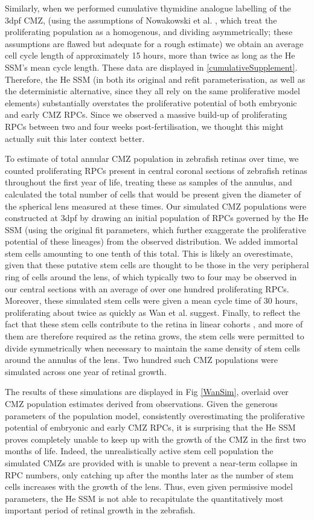 Similarly, when we performed cumulative thymidine analogue labelling of the 3dpf CMZ, (using the assumptions of Nowakowski et al. \cite{Nowakowski1989}, which treat the proliferating population as a homogenous, and dividing asymmetrically; these assumptions are flawed but adequate for a rough estimate) we obtain an average cell cycle length of approximately 15 hours, more than twice as long as the He SSM's mean cycle length. These data are displayed in \ref{cumulativeSupplement}. Therefore, the He SSM (in both its original and refit parameterisation, as well as the deterministic alternative, since they all rely on the same proliferative model elements) substantially overstates the proliferative potential of both embryonic and early CMZ RPCs. Since we observed a massive build-up of proliferating RPCs between two and four weeks post-fertilisation, we thought this might actually suit this later context better.

To estimate of total annular CMZ population in zebrafish retinas over time, we counted proliferating RPCs present in central coronal sections of zebrafish retinas throughout the first year of life, treating these as samples of the annulus, and calculated the total number of cells that would be present given the diameter of the spherical lens measured at these times. Our simulated CMZ populations were constructed at 3dpf by drawing an initial population of RPCs governed by the He SSM (using the original fit parameters, which further exaggerate the proliferative potential of these lineages) from the observed distribution. We added immortal stem cells amounting to one tenth of this total. This is likely an overestimate, given that these putative stem cells are thought to be those in the very peripheral ring of cells around the lens, of which typically two to four may be observed in our central sections with an average of over one hundred proliferating RPCs. Moreover, these simulated stem cells were given a mean cycle time of 30 hours, proliferating about twice as quickly as Wan et al. suggest. Finally, to reflect the fact that these stem cells contribute to the retina in linear cohorts \cite{Centanin2014}, and more of them are therefore required as the retina grows, the stem cells were permitted to divide symmetrically when necessary to maintain the same density of stem cells around the annulus of the lens. Two hundred such CMZ populations were simulated across one year of retinal growth.

The results of these simulations are displayed in Fig \ref{WanSim}, overlaid over CMZ population estimates derived from observations. Given the generous parameters of the population model, consistently overestimating the proliferative potential of embryonic and early CMZ RPCs, it is surprising that the He SSM proves completely unable to keep up with the growth of the CMZ in the first two months of life. Indeed, the unrealistically active stem cell population the simulated CMZs are provided with is unable to prevent a near-term collapse in RPC numbers, only catching up after the months later as the number of stem cells increases with the growth of the lens. Thus, even given permissive model parameters, the He SSM is not able to recapitulate the quantitatively most important period of retinal growth in the zebrafish.

